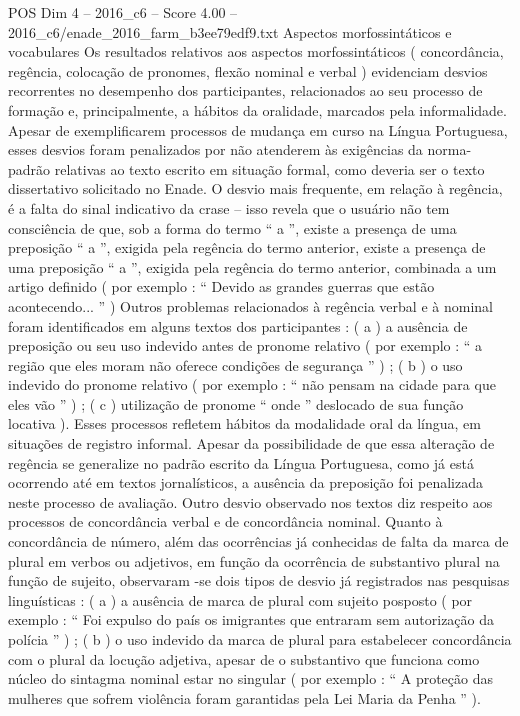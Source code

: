 \begin{textsample}{POS Dim 4 – 2016\_c6 – Score 4.00 – 2016\_c6/enade\_2016\_farm\_b3ee79edf9.txt}
Aspectos morfossintáticos e vocabulares Os resultados relativos aos aspectos morfossintáticos ( concordância, regência, colocação de pronomes, flexão nominal e verbal ) evidenciam desvios recorrentes no desempenho dos participantes, relacionados ao seu processo de formação e, principalmente, a hábitos da oralidade, marcados pela informalidade.
Apesar de exemplificarem processos de mudança em curso na Língua Portuguesa, esses desvios foram penalizados por não atenderem às exigências da norma-padrão relativas ao texto escrito em situação formal, como deveria ser o texto dissertativo solicitado no Enade.
O desvio mais frequente, em relação à regência, é a falta do sinal indicativo da crase – isso revela que o usuário não tem consciência de que, sob a forma do termo “ a ”, existe a presença de uma preposição “ a ”, exigida pela regência do termo anterior, existe a presença de uma preposição “ a ”, exigida pela regência do termo anterior, combinada a um artigo definido ( por exemplo : “ Devido as grandes guerras que estão acontecendo... ” ) Outros problemas relacionados à regência verbal e à nominal foram identificados em alguns textos dos participantes : ( a ) a ausência de preposição ou seu uso indevido antes de pronome relativo ( por exemplo : “ a região que eles moram não oferece condições de segurança ” ) ; ( b ) o uso indevido do pronome relativo ( por exemplo : “ não pensam na cidade para que eles vão ” ) ; ( c ) utilização de pronome “ onde ” deslocado de sua função locativa ).
Esses processos refletem hábitos da modalidade oral da língua, em situações de registro informal.
Apesar da possibilidade de que essa alteração de regência se generalize no padrão escrito da Língua Portuguesa, como já está ocorrendo até em textos jornalísticos, a ausência da preposição foi penalizada neste processo de avaliação.
Outro desvio observado nos textos diz respeito aos processos de concordância verbal e de concordância nominal.
Quanto à concordância de número, além das ocorrências já conhecidas de falta da marca de plural em verbos ou adjetivos, em função da ocorrência de substantivo plural na função de sujeito, observaram -se dois tipos de desvio já registrados nas pesquisas linguísticas : ( a ) a ausência de marca de plural com sujeito posposto ( por exemplo : “ Foi expulso do país os imigrantes que entraram sem autorização da polícia ” ) ; ( b ) o uso indevido da marca de plural para estabelecer concordância com o plural da locução adjetiva, apesar de o substantivo que funciona como núcleo do sintagma nominal estar no singular ( por exemplo : “ A proteção das mulheres que sofrem violência foram garantidas pela Lei Maria da Penha ” ).

\end{textsample}
